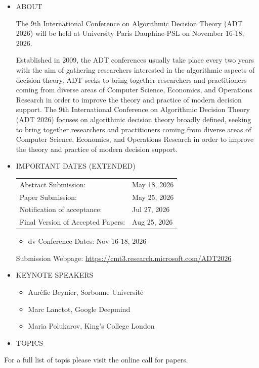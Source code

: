 \documentclass[prodmode,acmtecs]{acmsmall} %
\begin{document}
\begin{itemize}\item  ABOUT  
 
 The 9th International Conference on Algorithmic Decision Theory (ADT 2026) will be held at University Paris Dauphine-PSL on November 16-18, 2026.  
 
  Established in 2009, the ADT conferences usually take place every two years with the aim of gathering researchers interested in the algorithmic aspects of decision theory. ADT seeks to bring together researchers and practitioners coming from diverse areas of Computer Science, Economics, and Operations Research in order to improve the theory and practice of modern decision support. The 9th International Conference on Algorithmic Decision Theory (ADT 2026) focuses on algorithmic decision theory broadly defined, seeking to bring together researchers and practitioners coming from diverse areas of Computer Science, Economics, and Operations Research in order to improve the theory and practice of modern decision support. 
 
\item  IMPORTANT DATES (EXTENDED) 
 
\begin{tabulary}{\linewidth}{LL}Abstract Submission:  & May 18, 2026 \\
Paper Submission:  & May 25, 2026 \\
Notification of acceptance:  & Jul 27, 2026 \\
Final Version of Accepted Papers:  & Aug 25, 2026 \\
\end{tabulary}
 
\begin{itemize}\item  dv Conference Dates: Nov 16-18, 2026 
\end{itemize} 
  Submission Webpage: \href{https://cmt3.research.microsoft.com/ADT2026}{https://cmt3.research.microsoft.com/ADT2026}  
 
\item  KEYNOTE SPEAKERS  
 
\begin{itemize}\item  Aurélie Beynier, Sorbonne Université
\item  Marc Lanctot, Google Deepmind
\item  Maria Polukarov, King's College London
\end{itemize} 
\item  TOPICS  
 
\end{itemize}For a full list of topis please visit the online call for papers.  
\end{document}
